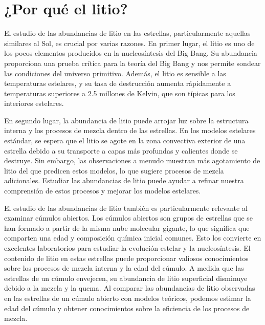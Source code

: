 
\chapter{¿Por qué el litio?}\label{ch:primer-capitulo}

El estudio de las abundancias de litio en las estrellas, particularmente aquellas similares al Sol, es crucial por varias razones. En primer lugar, el litio es uno de los pocos elementos producidos en la nucleosíntesis del Big Bang. Su abundancia proporciona una prueba crítica para la teoría del Big Bang y nos permite sondear las condiciones del universo primitivo. Además, el litio es sensible a las temperaturas estelares, y su tasa de destrucción aumenta rápidamente a temperaturas superiores a 2.5 millones de Kelvin, que son típicas para los interiores estelares.\par

En segundo lugar, la abundancia de litio puede arrojar luz sobre la estructura interna y los procesos de mezcla dentro de las estrellas. En los modelos estelares estándar, se espera que el litio se agote en la zona convectiva exterior de una estrella debido a su transporte a capas más profundas y calientes donde se destruye. Sin embargo, las observaciones a menudo muestran más agotamiento de litio del que predicen estos modelos, lo que sugiere procesos de mezcla adicionales. Estudiar las abundancias de litio puede ayudar a refinar nuestra comprensión de estos procesos y mejorar los modelos estelares.\par

El estudio de las abundancias de litio también es particularmente relevante al examinar cúmulos abiertos. Los cúmulos abiertos son grupos de estrellas que se han formado a partir de la misma nube molecular gigante, lo que significa que comparten una edad y composición química inicial comunes. Esto los convierte en excelentes laboratorios para estudiar la evolución estelar y la nucleosíntesis. El contenido de litio en estas estrellas puede proporcionar valiosos conocimientos sobre los procesos de mezcla interna y la edad del cúmulo. A medida que las estrellas de un cúmulo envejecen, su abundancia de litio superficial disminuye debido a la mezcla y la quema. Al comparar las abundancias de litio observadas en las estrellas de un cúmulo abierto con modelos teóricos, podemos estimar la edad del cúmulo y obtener conocimientos sobre la eficiencia de los procesos de mezcla.\par

